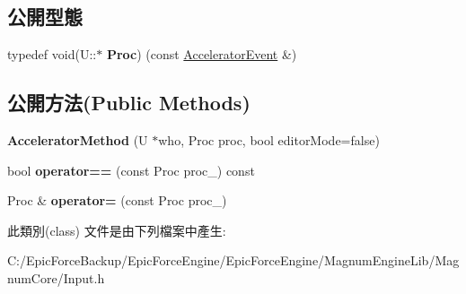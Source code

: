 \subsection*{公開型態}
\begin{DoxyCompactItemize}
\item 
typedef void(U\+::$\ast$ {\bfseries Proc}) (const \hyperlink{class_magnum_1_1_input_1_1_accelerator_event}{Accelerator\+Event} \&)\hypertarget{class_magnum_1_1_input_1_1_accelerator_method_aebbb4c2a7e501cc9b3c54dcfdad24df6}{}\label{class_magnum_1_1_input_1_1_accelerator_method_aebbb4c2a7e501cc9b3c54dcfdad24df6}

\end{DoxyCompactItemize}
\subsection*{公開方法(Public Methods)}
\begin{DoxyCompactItemize}
\item 
{\bfseries Accelerator\+Method} (U $\ast$who, Proc proc, bool editor\+Mode=false)\hypertarget{class_magnum_1_1_input_1_1_accelerator_method_a132921c65acf28da4f4bf1f43a881b67}{}\label{class_magnum_1_1_input_1_1_accelerator_method_a132921c65acf28da4f4bf1f43a881b67}

\item 
bool {\bfseries operator==} (const Proc proc\+\_\+) const \hypertarget{class_magnum_1_1_input_1_1_accelerator_method_ac880f96e6fb0b9c6b243b6d5a2f859c5}{}\label{class_magnum_1_1_input_1_1_accelerator_method_ac880f96e6fb0b9c6b243b6d5a2f859c5}

\item 
Proc \& {\bfseries operator=} (const Proc proc\+\_\+)\hypertarget{class_magnum_1_1_input_1_1_accelerator_method_ad1dbe65472fe222d82bb3dc1800e6065}{}\label{class_magnum_1_1_input_1_1_accelerator_method_ad1dbe65472fe222d82bb3dc1800e6065}

\end{DoxyCompactItemize}


此類別(class) 文件是由下列檔案中產生\+:\begin{DoxyCompactItemize}
\item 
C\+:/\+Epic\+Force\+Backup/\+Epic\+Force\+Engine/\+Epic\+Force\+Engine/\+Magnum\+Engine\+Lib/\+Magnum\+Core/Input.\+h\end{DoxyCompactItemize}
